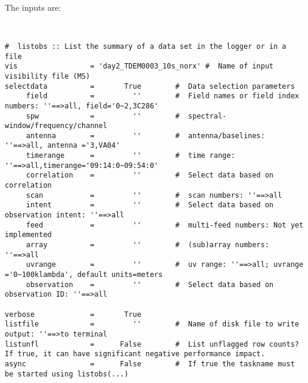 The inputs are:
\small
\begin{verbatim}


#  listobs :: List the summary of a data set in the logger or in a file
vis                 = 'day2_TDEM0003_10s_norx' #  Name of input visibility file (MS)
selectdata          =       True        #  Data selection parameters
     field          =         ''        #  Field names or field index numbers: ''==>all, field='0~2,3C286'
     spw            =         ''        #  spectral-window/frequency/channel
     antenna        =         ''        #  antenna/baselines: ''==>all, antenna ='3,VA04'
     timerange      =         ''        #  time range: ''==>all,timerange='09:14:0~09:54:0'
     correlation    =         ''        #  Select data based on correlation
     scan           =         ''        #  scan numbers: ''==>all
     intent         =         ''        #  Select data based on observation intent: ''==>all
     feed           =         ''        #  multi-feed numbers: Not yet implemented
     array          =         ''        #  (sub)array numbers: ''==>all
     uvrange        =         ''        #  uv range: ''==>all; uvrange ='0~100klambda', default units=meters
     observation    =         ''        #  Select data based on observation ID: ''==>all

verbose             =       True        
listfile            =         ''        #  Name of disk file to write output: ''==>to terminal
listunfl            =      False        #  List unflagged row counts? If true, it can have significant negative performance impact.
async               =      False        #  If true the taskname must be started using listobs(...)

\end{verbatim}
\normalsize

